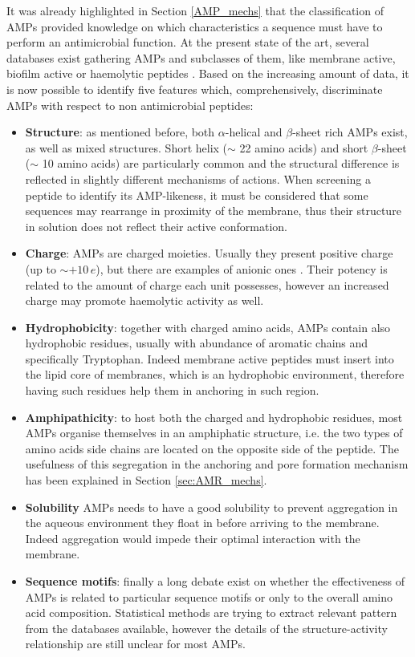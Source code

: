 It was already highlighted in Section \ref{AMP_mechs} that the classification of AMPs provided knowledge on which characteristics a sequence must have to perform an antimicrobial function.
%
At the present state of the art, several databases exist gathering AMPs and subclasses of them, like membrane active, biofilm active or haemolytic  peptides \cite{???}. Based on the increasing amount of data, it is now possible to identify five features which, comprehensively, discriminate AMPs with respect to non antimicrobial peptides:
%
\begin{itemize}
\item \textbf{Structure}: as mentioned before, both $\alpha$-helical and $\beta$-sheet rich AMPs exist, as well as mixed structures. Short helix ($\sim$ 22 amino acids) \cite{verifyyyyy} and short $\beta$-sheet ($\sim$ 10 amino acids) \cite{verifyyyyy} are particularly common and the structural difference is reflected in slightly different mechanisms of actions. When screening a peptide to identify its AMP-likeness, it must be considered that some sequences may rearrange in proximity of the membrane, thus their structure in solution does not reflect their active conformation.
\item \textbf{Charge}: AMPs are charged moieties. Usually they present positive charge (up to $\sim + 10\,e$), but there are examples of anionic ones \cite{see_example_on_AMPR}. Their potency is related to the amount of charge each unit possesses, however an increased charge may promote haemolytic activity as well. \cite{???}
\item \textbf{Hydrophobicity}: together with charged amino acids, AMPs contain also hydrophobic residues, usually with abundance of aromatic chains and specifically Tryptophan. Indeed membrane active peptides must insert into the lipid core of membranes, which is an hydrophobic environment, therefore having such residues help them in anchoring in such region.
\item \textbf{Amphipathicity}: to host both the charged and hydrophobic residues, most AMPs organise themselves in an amphiphatic structure, i.e. the two types of amino acids side chains are located on the opposite side of the peptide. The usefulness of this segregation in the anchoring and pore formation mechanism has been explained in Section \ref{sec:AMR_mechs}.
\item \textbf{Solubility} AMPs needs to have a good solubility to prevent aggregation in the aqueous environment they float in before arriving to the membrane. Indeed aggregation would impede their optimal interaction with the membrane.
\item \textbf{Sequence motifs}: finally a long debate exist on whether the effectiveness of AMPs is related to particular sequence motifs or only to the overall amino acid composition. Statistical methods are trying to extract relevant pattern from the databases available, however the details of the structure-activity relationship are still unclear for most AMPs.
\end{itemize}
